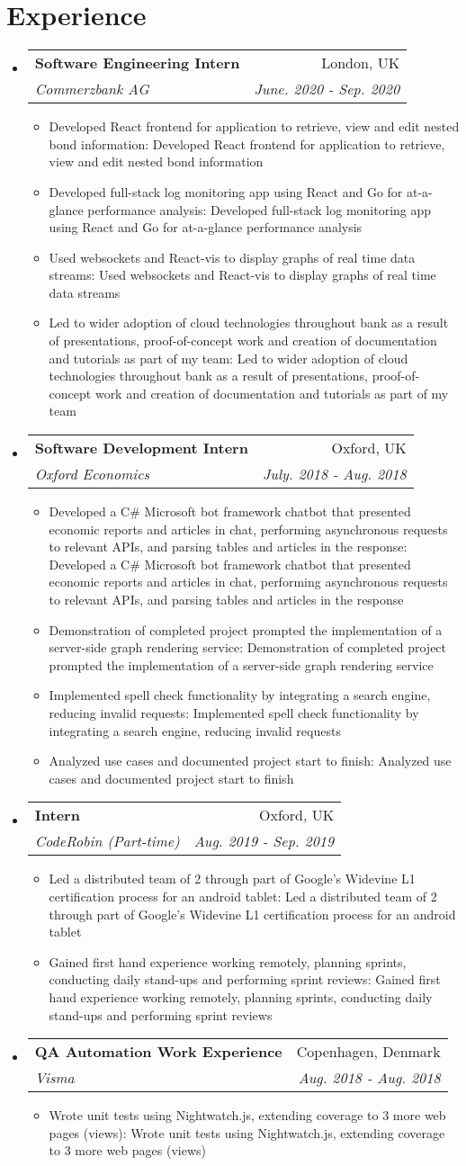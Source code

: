 \documentclass[a4paper,11pt]{article}
\makeatletter
\def \ifempty#1{\def\temp{#1} \ifx\temp\empty }
\newcommand{\resumeItem}[2]{
  \item\small{
  	\ifempty{#1}#2\else\textbf{#1}{: #2 \vspace{-2pt}}\fi
  }
}
\newcommand{\resumeSubheading}[4]{
  \vspace{-1pt}\item
    \begin{tabular*}{0.97\textwidth}{l@{\extracolsep{\fill}}r}
      \textbf{#1} & #2 \\
      \textit{\small#3} & \textit{\small #4} \\
    \end{tabular*}\vspace{-5pt}
}
\newcommand{\resumeSubHeadingListStart}{\begin{itemize}[leftmargin=*]}
\newcommand{\resumeSubHeadingListEnd}{\end{itemize}}
\newcommand{\resumeItemListStart}{\begin{itemize}}
\newcommand{\resumeItemListEnd}{\end{itemize}\vspace{-5pt}}
\makeatother
\begin{document}
\section{Experience}
  \resumeSubHeadingListStart
    \resumeSubheading
      {Software Engineering Intern}{London, UK}
      {Commerzbank AG}{June. 2020 - Sep. 2020}
      \resumeItemListStart
      	\resumeItem{}
          {Developed React frontend for application to retrieve, view and edit nested bond information}
        \resumeItem{}
          {Developed full-stack log monitoring app using React and Go for at-a-glance performance analysis}
        \resumeItem{}
          {Used websockets and React-vis to display graphs of real time data streams}
        \resumeItem{}
          {Led to wider adoption of cloud technologies throughout bank as a result of presentations, proof-of-concept work and creation of documentation and tutorials as part of my team}
      \resumeItemListEnd
    \resumeSubheading
      {Software Development Intern}{Oxford, UK}
      {Oxford Economics}{July. 2018 - Aug. 2018}
      \resumeItemListStart
      	\resumeItem{}
          {Developed a C\# Microsoft bot framework chatbot that presented economic 
          reports and articles in chat, performing asynchronous requests to relevant APIs,
          and parsing tables and articles in the response}
        \resumeItem{}
          {Demonstration of completed project prompted the 
          implementation of a server-side graph rendering service}
        \resumeItem{}  
          {Implemented spell check functionality by integrating a search 
          engine, reducing invalid requests}
        \resumeItem{}
          {Analyzed use cases and documented project start to finish}
      \resumeItemListEnd
    \resumeSubheading
      {Intern}{Oxford, UK}
      {CodeRobin (Part-time)}{Aug. 2019 - Sep. 2019}
      \resumeItemListStart
      	\resumeItem{}
          {Led a distributed team of 2 through part of Google's Widevine L1 certification process 
          for an android tablet}
        \resumeItem{}
          {Gained first hand experience working remotely, planning sprints, conducting daily 
          stand-ups and performing sprint reviews}
      \resumeItemListEnd
    \resumeSubheading
      {QA Automation Work Experience}{Copenhagen, Denmark}
      {Visma}{Aug. 2018 - Aug. 2018}
      \resumeItemListStart
      	\resumeItem{}
          {Wrote unit tests using Nightwatch.js, extending coverage to 3 more web pages (views)}
      \resumeItemListEnd
    
  \resumeSubHeadingListEnd
\end{document}
